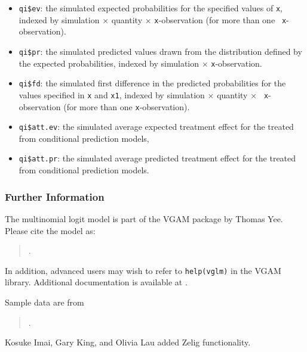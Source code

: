 \begin{itemize}
   \begin{itemize}
   \item {\tt qi\$ev}: the simulated expected probabilities for the
     specified values of {\tt x}, indexed by simulation $\times$
     quantity $\times$ {\tt x}-observation (for more than one {\tt
       x}-observation).
   \item {\tt qi\$pr}: the simulated predicted values drawn from the
     distribution defined by the expected probabilities, indexed by
     simulation $\times$ {\tt x}-observation.
   \item {\tt qi\$fd}: the simulated first difference in the predicted
     probabilities for the values specified in {\tt x} and {\tt x1},
     indexed by simulation $\times$ quantity $\times$ {\tt
       x}-observation (for more than one {\tt x}-observation).
   \item {\tt qi\$att.ev}: the simulated average expected treatment
     effect for the treated from conditional prediction models, 
   \item {\tt qi\$att.pr}: the simulated average predicted treatment
     effect for the treated from conditional prediction models.  
   \end{itemize}
\end{itemize}

\subsubsection{Further Information}

The multinomial logit model is part of the VGAM package by Thomas Yee.
Please cite the model as:
\begin{verse}
.
\end{verse}

In addition, advanced users may wish to refer to \texttt{help(vglm)}
in the VGAM library.  Additional documentation is available at
.

Sample data are from 
\begin{verse}
.  
\end{verse}

Kosuke Imai, Gary King, and Olivia Lau added Zelig functionality.  

